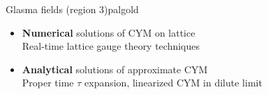 \documentclass[aspectratio=169,11pt,usenames,dvipsnames]{beamer}
\begin{document}
\begin{frame}
\begin{columns}[onlytextwidth,t]
        \begin{custombox2}{{\normalsize Glasma fields} {\tiny (region 3)}}{palgold}
            \small
            \begin{varwidth}{0.93\textwidth}
            \begin{itemize}\itemsep0em 
                \footnotesize
                \item {\bfseries Numerical} solutions of CYM on lattice \\
                {\tiny\color{lightgray} Real-time lattice gauge theory techniques}
                \item {\bfseries Analytical} solutions of approximate CYM \\
                {\tiny\color{lightgray} Proper time $\tau$ expansion, linearized CYM in dilute limit}
            \end{itemize}
            \end{varwidth}
        \end{custombox2}
    \end{columns}

\end{frame}
\end{document}
